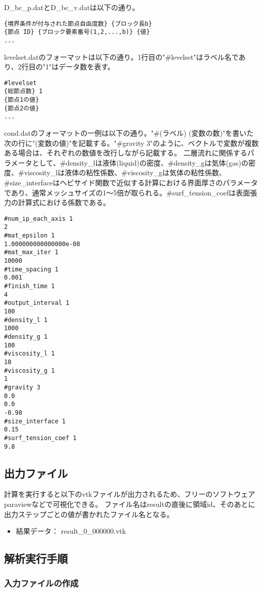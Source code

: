 D\_bc\_p.datとD\_bc\_v.datは以下の通り。
\begin{lstlisting}[]
{境界条件が付与された節点自由度数} {ブロック長b}
{節点 ID} {ブロック要素番号(1,2,...,b)} {値}
...
\end{lstlisting}

levelset.datのフォーマットは以下の通り。1行目の"\#levelset"はラベル名であり、2行目の"1"はデータ数を表す。
\begin{lstlisting}[]
#levelset
{総節点数} 1
{節点1の値}
{節点2の値}
...
\end{lstlisting}


cond.datのフォーマットの一例は以下の通り。"\#(ラベル) (変数の数)"を書いた次の行に"(変数の値)"を記載する。"\#gravity 3"のように、ベクトルで変数が複数ある場合は、それぞれの数値を改行しながら記載する。
二層流れに関係するパラメータとして、\#density\_lは液体(liquid)の密度、\#density\_gは気体(gas)の密度、\#viscosity\_lは液体の粘性係数、\#viscosity\_gは気体の粘性係数、\#size\_interfaceはヘビサイド関数で近似する計算における界面厚さのパラメータであり、通常メッシュサイズの1～5倍が取られる。\#surf\_tension\_coefは表面張力の計算式における係数である。
\begin{lstlisting}[]
#num_ip_each_axis 1
2
#mat_epsilon 1
1.000000000000000e-08
#mat_max_iter 1
10000
#time_spacing 1
0.001
#finish_time 1
4
#output_interval 1
100
#density_l 1
1000
#density_g 1
100
#viscosity_l 1
10
#viscosity_g 1
1
#gravity 3
0.0
0.0
-0.98
#size_interface 1
0.15
#surf_tension_coef 1
9.8

\end{lstlisting}

\subsection{出力ファイル}

計算を実行すると以下のvtkファイルが出力されるため、フリーのソフトウェアparaviewなどで可視化できる。
ファイル名はresultの直後に領域id、そのあとに出力ステップごとの値が書かれたファイル名となる。
\begin{itemize}
	\item 結果データ： result\_0\_000000.vtk
\end{itemize}

\subsection{解析実行手順}
\subsubsection{入力ファイルの作成}


